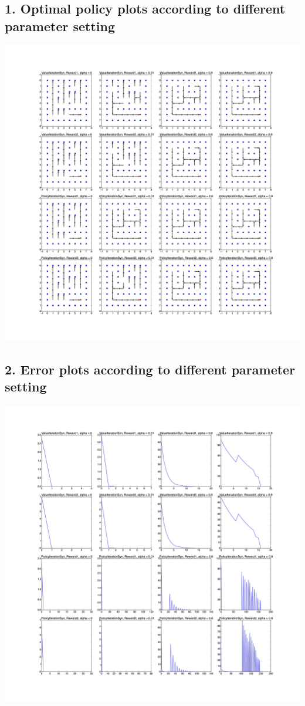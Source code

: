 \documentclass[12pt,a4paper,titlepage]{article}
\begin{document}
\subsection*{1. Optimal policy plots according to different parameter setting}
\begin{center}
\includegraphics[scale=0.11]{PolicyPlot.jpg}
\end{center}
\newpage
\subsection*{2. Error plots according to different parameter setting}
\begin{center}
\includegraphics[scale=0.11]{ErrorPlot.jpg}
\end{center}
\newpage
\end{document}

